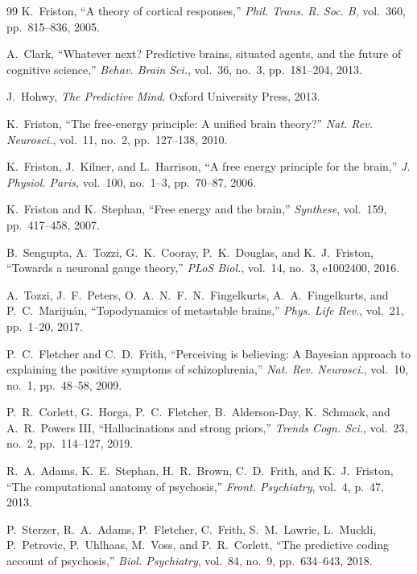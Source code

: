 \documentclass[12pt,a4paper]{article}
\theoremstyle{remark}
\begin{document}
\begin{thebibliography}{99}
K.~Friston, ``A theory of cortical responses,'' \emph{Phil. Trans. R. Soc.
B}, vol.~360, pp.~815--836, 2005.

A.~Clark, ``Whatever next? Predictive brains, situated agents, and the
future of cognitive science,'' \emph{Behav. Brain Sci.}, vol.~36, no.~3,
pp.~181--204, 2013.

J.~Hohwy, \emph{The Predictive Mind}. Oxford University Press, 2013.

K.~Friston, ``The free-energy principle: A unified brain theory?''
\emph{Nat. Rev. Neurosci.}, vol.~11, no.~2, pp.~127--138, 2010.

K.~Friston, J.~Kilner, and L.~Harrison, ``A free energy principle for the
brain,'' \emph{J. Physiol. Paris}, vol.~100, no.~1--3, pp.~70--87, 2006.

K.~Friston and K.~Stephan, ``Free energy and the brain,''
\emph{Synthese}, vol.~159, pp.~417--458, 2007.

B.~Sengupta, A.~Tozzi, G.~K.~Cooray, P.~K.~Douglas, and K.~J.~Friston,
``Towards a neuronal gauge theory,'' \emph{PLoS Biol.}, vol.~14, no.~3,
e1002400, 2016.

A.~Tozzi, J.~F.~Peters, O.~A.~N.~F.~N.~Fingelkurts, A.~A.~Fingelkurts,
and P.~C.~Mariju\'{a}n, ``Topodynamics of metastable brains,''
\emph{Phys. Life Rev.}, vol.~21, pp.~1--20, 2017.

P.~C.~Fletcher and C.~D.~Frith, ``Perceiving is believing: A Bayesian
approach to explaining the positive symptoms of schizophrenia,''
\emph{Nat. Rev. Neurosci.}, vol.~10, no.~1, pp.~48--58, 2009.

P.~R.~Corlett, G.~Horga, P.~C.~Fletcher, B.~Alderson-Day,
K.~Schmack, and A.~R.~Powers III, ``Hallucinations and strong priors,''
\emph{Trends Cogn. Sci.}, vol.~23, no.~2, pp.~114--127, 2019.

R.~A.~Adams, K.~E.~Stephan, H.~R.~Brown, C.~D.~Frith, and K.~J.~Friston,
``The computational anatomy of psychosis,'' \emph{Front. Psychiatry}, vol.~4,
p.~47, 2013.

P.~Sterzer, R.~A.~Adams, P.~Fletcher, C.~Frith, S.~M.~Lawrie,
L.~Muckli, P.~Petrovic, P.~Uhlhaas, M.~Voss, and P.~R.~Corlett,
``The predictive coding account of psychosis,'' \emph{Biol. Psychiatry},
vol.~84, no.~9, pp.~634--643, 2018.


\end{thebibliography}
\end{document}
